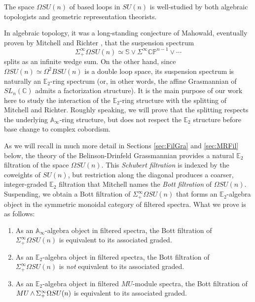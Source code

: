 The space $\Omega SU(n)$ of based loops in $SU(n)$ is well-studied by both algebraic topologists and geometric representation theorists.

In algebraic topology, it was a long-standing conjecture of Mahowald, eventually proven by Mitchell and Richter \cite[Theorem 2.1]{CrabbMitchell}, that the suspension spectrum 
$$\Sigma^{\infty}_+ \Omega SU(n) \simeq \mathbb{S} \vee \Sigma^{\infty} \mathbb{CP}^{n-1} \vee \cdots$$
splits as an infinite wedge sum.  On the other hand, since $\Omega SU(n) \simeq \Omega^2 BSU(n)$ is a double loop space, its suspension spectrum is naturally an $\mathbb{E}_2$-ring spectrum (or, in other words, the affine Grasmannian of $SL_n(\mathbb{C})$ admits a factorization structure).  It is the main purpose of our work here to study the interaction of the $\mathbb{E}_2$-ring structure with the splitting of Mitchell and Richter.  Roughly speaking, we will prove that the splitting respects the underlying $\mathbb{A}_\infty$-ring structure, but does not respect the $\mathbb{E}_2$ structure before base change to complex cobordism.

As we will recall in much more detail in Sections \ref{sec:FilGra} and \ref{sec:MRFil} below, the theory of the Belinson-Drinfeld Grassmannian provides a natural $\mathbb{E}_2$ filtration of the space $\Omega SU(n)$.  This \textit{Schubert filtration} is indexed by the coweights of $SU(n)$, but restriction along the diagonal produces a coarser, integer-graded $\mathbb{E}_2$ filtration that Mitchell names the \textit{Bott filtration} of $\Omega SU(n)$.  Suspending, we obtain a Bott filtration of $\Sigma^{\infty}_+ \Omega SU(n)$ that forms an $\mathbb{E}_2$-algebra object in the symmetric monoidal category of filtered spectra.  What we prove is as follows:

\begin{thm}
\begin{enumerate}
\item As an $\mathbb{A}_\infty$-algebra object in filtered spectra, the Bott filtration of $\Sigma^{\infty}_+ \Omega SU(n)$ is equivalent to its associated graded.
\item As an $\mathbb{E}_2$-algebra object in filtered spectra, the Bott filtration of $\Sigma^{\infty}_+ \Omega SU(n)$ is \textit{not} equivalent to its associated graded.
\item As an $\mathbb{E}_2$-algebra object in filtered $MU$-module spectra, the Bott filtration of $MU \operatorname{\wedge} \Sigma^{\infty}_+ \Omega SU(n)$ is equivalent to its associated graded.
\end{enumerate}
\end{thm}

